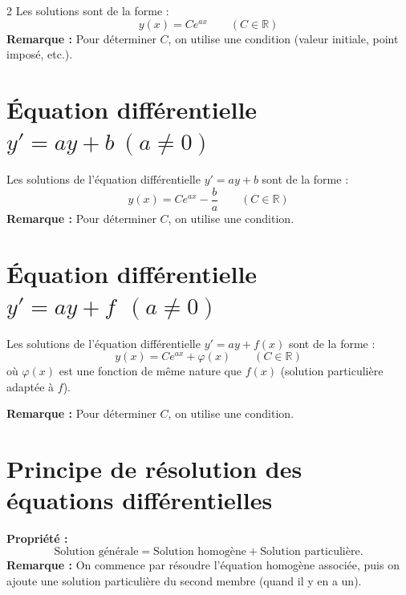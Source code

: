 \documentclass[11pt,a4paper]{article}
\newcommand{\prop}{\textbf{Propriété :} }
\newcommand{\rem}{\textbf{Remarque :} }
\begin{document}
\begin{paracol}{2}
Les solutions sont de la forme :
\[
y(x)=Ce^{ax}\qquad (C\in\mathbb{R})
\]
\rem Pour déterminer $C$, on utilise une condition (valeur initiale, point imposé, etc.).

\switchcolumn
\setcounter{section}{2}


\section{Équation différentielle $y'=ay+b\ (a\neq 0)$}
Les solutions de l'équation différentielle $y'=ay+b$ sont de la forme :
\[
y(x)=Ce^{ax}-\frac{b}{a}\qquad (C\in\mathbb{R})
\]
\rem Pour déterminer $C$, on utilise une condition.

\section{Équation différentielle $y'=ay+f\ \ (a\neq 0)$}
Les solutions de l'équation différentielle $y'=ay+f(x)$ sont de la forme :
\[
y(x)=Ce^{ax}+\varphi(x)\qquad (C\in\mathbb{R})
\]
où $\varphi(x)$ est une fonction de même nature que $f(x)$ (solution particulière adaptée à $f$).

\rem Pour déterminer $C$, on utilise une condition.

\section{Principe de résolution des équations différentielles}
\prop
\[
\text{Solution générale}=\text{Solution homogène}+\text{Solution particulière}.
\]
\rem On commence par résoudre l'équation homogène associée, puis on ajoute une solution particulière
du second membre (quand il y en a un).

\end{paracol}
\end{document}
